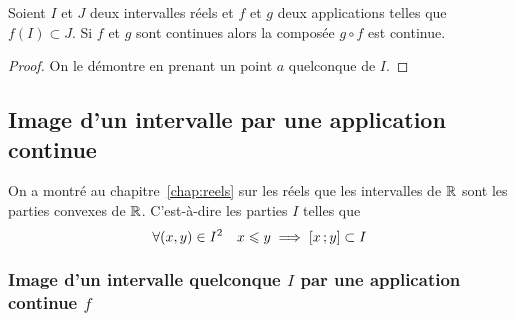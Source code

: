 \begin{prop}
  Soient \(I\) et \(J\) deux intervalles réels et \(f\) et \(g\) deux
  applications telles que \(f(I) \subset J\). Si \(f\) et \(g\) sont continues
  alors la composée \(g \circ f\) est continue.
\end{prop}
\begin{proof}
  On le démontre en prenant un point \(a\) quelconque de \(I\).
\end{proof}

\subsection{Image d'un intervalle par une application continue}

\begin{rappel}
  On a montré au chapitre~\ref{chap:reels} sur les réels que les intervalles de
  \(\mathbb{R}\) sont les parties
  convexes de \(\mathbb{R}\). C'est-à-dire les parties \(I\) telles que
  \begin{equation}
    \forall (x,y) \in I^2 \quad x \leqslant y \implies \left[ x \, ; {} y \right]
    \subset I
  \end{equation}
\end{rappel}

\subsubsection[Image continue d'un intervalle quelconque]{Image d'un intervalle
quelconque \(I\) par une application continue \(f\)}

